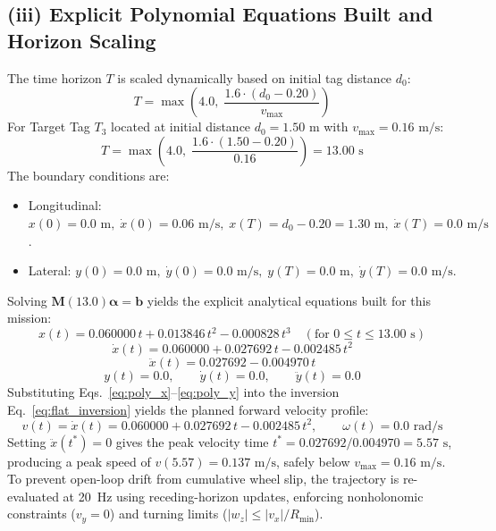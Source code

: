 \documentclass[10pt,a4paper]{article}
\begin{document}
\subsection*{(iii) Explicit Polynomial Equations Built and Horizon Scaling}
The time horizon $T$ is scaled dynamically based on initial tag distance $d_0$:
\begin{equation}
    T = \max\left(4.0,\; \frac{1.6 \cdot (d_0 - 0.20)}{v_{\max}}\right)
\end{equation}
For Target Tag $T_3$ located at initial distance $d_0 = 1.50\text{~m}$ with $v_{\max} = 0.16\text{~m/s}$:
\begin{equation}
    T = \max\left(4.0,\; \frac{1.6 \cdot (1.50 - 0.20)}{0.16}\right) = 13.00\text{~s}
\end{equation}
The boundary conditions are:
\begin{itemize}[noitemsep,topsep=1pt]
    \item Longitudinal: $x(0) = 0.0\text{~m}, \;\dot{x}(0) = 0.06\text{~m/s}, \;x(T) = d_0 - 0.20 = 1.30\text{~m}, \;\dot{x}(T) = 0.0\text{~m/s}$.
    \item Lateral: $y(0) = 0.0\text{~m}, \;\dot{y}(0) = 0.0\text{~m/s}, \;y(T) = 0.0\text{~m}, \;\dot{y}(T) = 0.0\text{~m/s}$.
\end{itemize}
Solving $\mathbf{M}(13.0)\boldsymbol{\alpha} = \mathbf{b}$ yields the explicit analytical equations built for this mission:
\begin{equation}
    \boxed{x(t) = 0.060000\,t + 0.013846\,t^2 - 0.000828\,t^3 \quad (\text{for } 0 \le t \le 13.00\text{~s})}
    \label{eq:poly_x}
\end{equation}
\begin{equation}
    \dot{x}(t) = 0.060000 + 0.027692\,t - 0.002485\,t^2
\end{equation}
\begin{equation}
    \ddot{x}(t) = 0.027692 - 0.004970\,t
\end{equation}
\begin{equation}
    \boxed{y(t) = 0.0, \qquad \dot{y}(t) = 0.0, \qquad \ddot{y}(t) = 0.0}
    \label{eq:poly_y}
\end{equation}
Substituting Eqs.~\eqref{eq:poly_x}--\eqref{eq:poly_y} into the inversion Eq.~\eqref{eq:flat_inversion} yields the planned forward velocity profile:
\begin{equation}
    v(t) = \dot{x}(t) = 0.060000 + 0.027692\,t - 0.002485\,t^2, \qquad \omega(t) = 0.0\text{~rad/s}
\end{equation}
Setting $\ddot{x}(t^*) = 0$ gives the peak velocity time $t^* = 0.027692 / 0.004970 = 5.57\text{~s}$, producing a peak speed of $v(5.57) = 0.137\text{~m/s}$, safely below $v_{\max} = 0.16\text{~m/s}$. To prevent open-loop drift from cumulative wheel slip, the trajectory is re-evaluated at 20~Hz using receding-horizon updates, enforcing nonholonomic constraints ($v_y = 0$) and turning limits ($|w_z| \le |v_x|/R_{\min}$).
\end{document}
